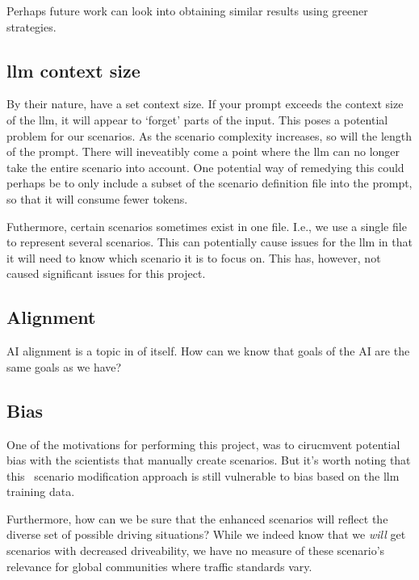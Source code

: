 Perhaps future work can look into obtaining similar results using greener strategies.


\subsection{\acrshort{llm} context size}

By their nature,  have a set context size. If your prompt exceeds the context size
of the \acrshort{llm}, it will appear to `forget' parts of the input. This poses a potential problem
for our scenarios. As the scenario complexity increases, so will the length of the prompt. There
will ineveatibly come a point where the \acrshort{llm} can no longer take the entire scenario into
account. One potential way of remedying this could perhaps be to only include a subset of the
scenario definition file into the prompt, so that it will consume fewer tokens.

Futhermore, certain scenarios sometimes exist in one file. I.e., we use a single file to represent
several scenarios. This can potentially cause issues for the \acrshort{llm} in that it will need to
know which scenario it is to focus on. This has, however, not caused significant issues for this project.

\subsection{Alignment}

AI alignment is a topic in of itself. How can we know that goals of the AI are the same goals as we
have?

\subsection{Bias}

One of the motivations for performing this project, was to cirucmvent potential bias with the
scientists that manually create scenarios. But it's worth noting that this \hefe~scenario
modification approach is still vulnerable to bias based on the \acrshort{llm} training data.

Furthermore, how can we be sure that the enhanced scenarios will reflect the diverse set of possible
driving situations? While we indeed know that we \emph{will} get scenarios with decreased
driveability, we have no measure of these scenario's relevance for global communities where traffic
standards vary.

